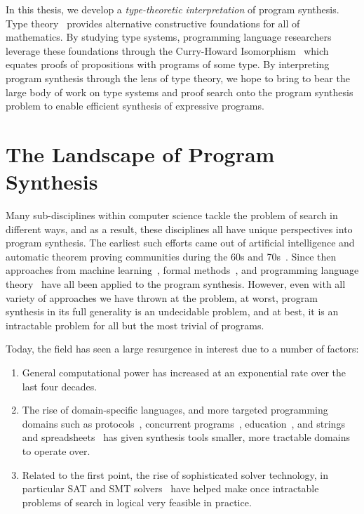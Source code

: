 In this thesis, we develop a \emph{type-theoretic interpretation} of program synthesis.
Type theory~\citep{martin-lof-1984} provides alternative constructive foundations for all of mathematics.
By studying type systems, programming language researchers leverage these foundations through the Curry-Howard Isomorphism~\citep{william-curry-1980} which equates proofs of propositions with programs of some type.
By interpreting program synthesis through the lens of type theory, we hope to bring to bear the large body of work on type systems and proof search onto the program synthesis problem to enable efficient synthesis of expressive programs.

\section{The Landscape of Program Synthesis}

Many sub-disciplines within computer science tackle the problem of search in different ways, and as a result, these disciplines all have unique perspectives into program synthesis.
The earliest such efforts came out of artificial intelligence and automatic theorem proving communities during the 60s and 70s~\citep{green-ijcai-1969, summers-popl-1976}.
Since then approaches from machine learning~\citep{lau-thesis-2001, briggs-kes-2008, weimer-icse-2009}, formal methods~\citep{srivastava-popl-2010, bodik-popl-2010, kuncak-pldi-2010}, and programming language theory~\citep{albarghouthi-cav-2013, gvero-pldi-2013, scherer-icfp-2015} have all been applied to the program synthesis.
However, even with all variety of approaches we have thrown at the problem, at worst, program synthesis in its full generality is an undecidable problem, and at best, it is an intractable problem for all but the most trivial of programs.

Today, the field has seen a large resurgence in interest due to a number of factors:
\begin{enumerate}
  \item General computational power has increased at an exponential rate over the last four decades.~\citep{moore-electronics-1965}
  \item The rise of domain-specific languages, and more targeted programming domains such as protocols~\citep{alur-popl-2005, udupa-pldi-2013}, concurrent programs~\citep{solar-lezama-pldi-2008, cerny-cav-2011, prountzos-oopsla-2012}, education~\citep{singh-pldi-2013}, and strings and spreadsheets~\citep{gulwani-popl-2011} has given synthesis tools smaller, more tractable domains to operate over.
  \item Related to the first point, the rise of sophisticated solver technology, in particular SAT and SMT solvers~\citep{barrett-smt-2008} have helped make once intractable problems of search in logical very feasible in practice.
\end{enumerate}

